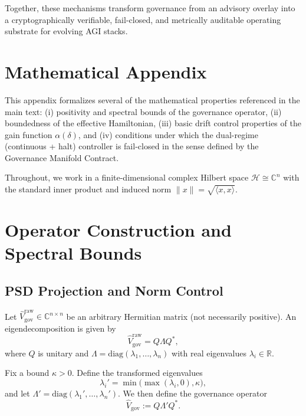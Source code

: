 \documentclass[11pt]{article}
\begin{document}
Together, these mechanisms transform governance from an advisory overlay into a cryptographically verifiable, fail-closed, and metrically auditable operating substrate for evolving AGI stacks.

\appendix
\section*{Mathematical Appendix}

This appendix formalizes several of the mathematical properties referenced in the main text:
(i) positivity and spectral bounds of the governance operator,
(ii) boundedness of the effective Hamiltonian,
(iii) basic drift control properties of the gain function $\alpha(\delta)$,
and (iv) conditions under which the dual-regime (continuous + halt) controller is fail-closed in the sense defined by the Governance Manifold Contract.

Throughout, we work in a finite-dimensional complex Hilbert space $\mathcal{H} \cong \mathbb{C}^n$ with the standard inner product and induced norm
$\|x\| = \sqrt{\langle x, x \rangle}$.

\section{Operator Construction and Spectral Bounds}

\subsection{PSD Projection and Norm Control}

\begin{definition}
Let $\hat{V}^{\mathrm{raw}}_{\mathrm{gov}} \in \mathbb{C}^{n \times n}$ be an arbitrary Hermitian matrix (not necessarily positive).
An eigendecomposition is given by
\begin{equation}
  \hat{V}^{\mathrm{raw}}_{\mathrm{gov}} = Q \Lambda Q^\ast,
\end{equation}
where $Q$ is unitary and $\Lambda = \mathrm{diag}(\lambda_1, \dots, \lambda_n)$ with real eigenvalues $\lambda_i \in \mathbb{R}$.
\end{definition}

\begin{definition}
Fix a bound $\kappa > 0$.
Define the transformed eigenvalues
\begin{equation}
  \lambda_i' = \min\big(\max(\lambda_i, 0), \kappa\big),
\end{equation}
and let $\Lambda' = \mathrm{diag}(\lambda_1', \dots, \lambda_n')$.
We then define the governance operator
\begin{equation}
  \hat{V}_{\mathrm{gov}} := Q \Lambda' Q^\ast.
\end{equation}
\end{definition}
\end{document}
